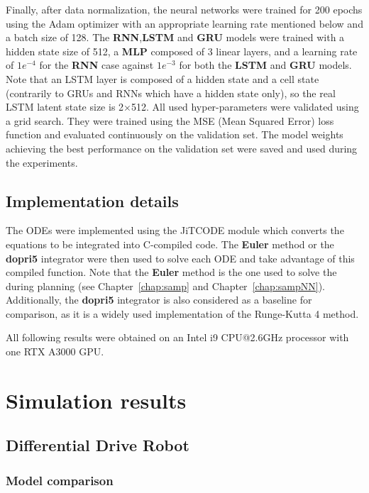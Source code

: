 Finally, after data normalization, the neural networks were trained for 200 epochs using the Adam optimizer \cite{kingma2014adam} with an appropriate learning rate mentioned below and a batch size of 128. 
The \textbf{RNN},\textbf{LSTM} and \textbf{GRU} models were trained with a hidden state size of 512, a \textbf{MLP} composed of 3 linear layers, and a learning rate of $1e^{-4}$ for the \textbf{RNN} case against $1e^{-3}$ for both the \textbf{LSTM} and \textbf{GRU} models.
Note that an LSTM layer is composed of a hidden state and a cell state (contrarily to GRUs and RNNs which have a hidden state only), so the real LSTM latent state size is 2$\times$512.
All used hyper-parameters were validated using a grid search.
They were trained using the MSE (Mean Squared Error) loss function and evaluated continuously on the validation set. 
The model weights achieving the best performance on the validation set were saved and used during the experiments.

\subsection{Implementation details}

The ODEs were implemented using the JiTCODE \cite{cJit} module which converts the equations to be integrated into C-compiled code.
The \textbf{Euler} method or the \textbf{dopri5} integrator were then used to solve each ODE and take advantage of this compiled function.
Note that the \textbf{Euler} method is the one used to solve the  during planning (see Chapter~\ref{chap:samp} and Chapter~\ref{chap:sampNN}).
Additionally, the \textbf{dopri5} integrator is also considered as a baseline for comparison, as it is a widely used implementation of the Runge-Kutta 4 method.

All following results were obtained on an Intel i9 CPU@2.6GHz processor with one RTX A3000 GPU. 

\section{Simulation results}\label{sec:nn_results}

\subsection{Differential Drive Robot}\label{sec:nn_results_unic}

\subsubsection{Model comparison}\label{sec:nn_comparaison_unic}

